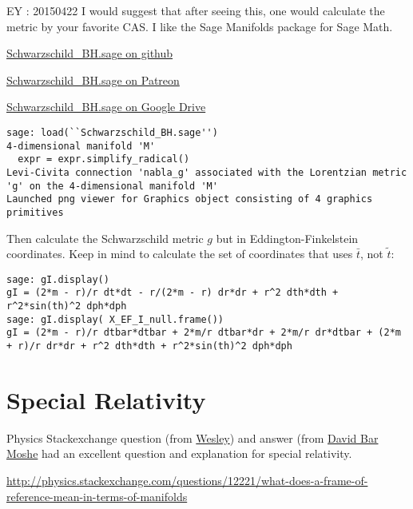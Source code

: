 \documentclass[10pt, twoside]{amsart}
\begin{document}
\begin{multicols*}{2}
EY : 20150422 I would suggest that after seeing this, one would calculate the metric by your favorite CAS.  I like the Sage Manifolds package for Sage Math.  

\href{https://github.com/ernestyalumni/diffgeo-by-sagemnfd/blob/master/Schwarzschild_BH.sage}{Schwarzschild\_BH.sage on github}

\href{https://www.patreon.com/file?s=645287&h=2254352&i=108637}{Schwarzschild\_BH.sage on Patreon}

\href{https://drive.google.com/file/d/0B1H1Ygkr4EWJdllTR3czQU9DeW8/view?usp=sharing}{Schwarzschild\_BH.sage on Google Drive}

\begin{lstlisting}[frame=single]
sage: load(``Schwarzschild_BH.sage'')
4-dimensional manifold 'M'
  expr = expr.simplify_radical()
Levi-Civita connection 'nabla_g' associated with the Lorentzian metric 'g' on the 4-dimensional manifold 'M'
Launched png viewer for Graphics object consisting of 4 graphics primitives
\end{lstlisting}

Then calculate the Schwarzschild metric $g$ but in Eddington-Finkelstein coordinates.  Keep in mind to calculate the set of coordinates that uses $\bar{t}$, not $\widetilde{t}$: 

\begin{lstlisting}[frame=single]
sage: gI.display()
gI = (2*m - r)/r dt*dt - r/(2*m - r) dr*dr + r^2 dth*dth + r^2*sin(th)^2 dph*dph
sage: gI.display( X_EF_I_null.frame())
gI = (2*m - r)/r dtbar*dtbar + 2*m/r dtbar*dr + 2*m/r dr*dtbar + (2*m + r)/r dr*dr + r^2 dth*dth + r^2*sin(th)^2 dph*dph
\end{lstlisting}



\part{Special Relativity}

Physics Stackexchange question (from \href{http://physics.stackexchange.com/users/4249/wesley}{Wesley}) and answer (from \href{http://physics.stackexchange.com/users/2190/david-bar-moshe}{David Bar Moshe} had an excellent question and explanation for special relativity.  

\url{http://physics.stackexchange.com/questions/12221/what-does-a-frame-of-reference-mean-in-terms-of-manifolds}




\end{multicols*}
\end{document}
